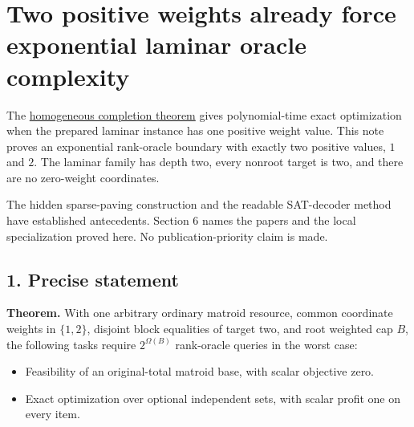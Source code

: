 
\hypertarget{af-e9b108715f-two-positive-weights-already-force-exponential-laminar-oracle-complexity}{%
\section{Two positive weights already force exponential laminar oracle complexity}\label{af-e9b108715f-two-positive-weights-already-force-exponential-laminar-oracle-complexity}}

The \href{https://github.com/icekylinx/algorithm-frontier/blob/main/problems/weighted-prefix-quota-frontier/manuscripts/laminar-dominant-weight-recovery.md}{homogeneous completion theorem} gives polynomial-time exact optimization when the prepared laminar instance has one positive weight value. This note proves an exponential rank-oracle boundary with exactly two positive values, \(1\) and \(2\). The laminar family has depth two, every nonroot target is two, and there are no zero-weight coordinates.

The hidden sparse-paving construction and the readable SAT-decoder method have established antecedents. Section 6 names the papers and the local specialization proved here. No publication-priority claim is made.

\hypertarget{af-e9b108715f-precise-statement}{%
\subsection{1. Precise statement}\label{af-e9b108715f-precise-statement}}

\textbf{Theorem.} With one arbitrary ordinary matroid resource, common coordinate weights in \(\{1,2\}\), disjoint block equalities of target two, and root weighted cap \(B\), the following tasks require \(2^{\Omega(B)}\) rank-oracle queries in the worst case:

\begin{itemize}
\tightlist
\item
  Feasibility of an original-total matroid base, with scalar objective zero.
\item
  Exact optimization over optional independent sets, with scalar profit one on every item.
\end{itemize}

